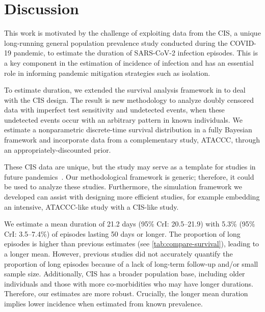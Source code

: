 \documentclass[referee,useAMS,usenatbib]{biom}
\begin{document}
\section{Discussion} \label{sec:discussion}

This work is motivated by the challenge of exploiting data from the CIS, a unique long-running general population prevalence study conducted during the COVID-19 pandemic, to estimate the duration of SARS-CoV-2 infection episodes.
This is a key component in the estimation of incidence of infection and has an essential role in informing pandemic mitigation strategies such as isolation.

To estimate duration, we extended the survival analysis framework in \citet{heiseyModelling} to deal with the CIS design. The result is new methodology to analyze doubly censored data with imperfect test sensitivity and undetected events, when these undetected events occur with an arbitrary pattern in known individuals.
We estimate a nonparametric discrete-time survival distribution in a fully Bayesian framework and incorporate data from a complementary study, ATACCC, through an appropriately-discounted prior.

These CIS data are unique, but the study may serve as a template for studies in future pandemics~\citep{hallettModule}.
Our methodological framework is generic; therefore, it could be used to analyze these studies.
Furthermore, the simulation framework we developed can assist with designing more efficient studies, for example embedding an intensive, ATACCC-like study with a CIS-like study.

We estimate a mean duration of 21.2 days (95\% CrI: 20.5--21.9) with 5.3\% (95\% CrI: 3.5--7.4\%) of episodes lasting 50 days or longer.
The proportion of long episodes is higher than previous estimates (see \cref{tab:compare-survival}), leading to a longer mean.
However, previous studies did not accurately quantify the proportion of long episodes because of a lack of long-term follow-up and/or small sample size.
Additionally, CIS has a broader population base, including older individuals and those with more co-morbidities who may have longer durations.
Therefore, our estimates are more robust.
Crucially, the longer mean duration implies lower incidence when estimated from known prevalence.
\end{document}
